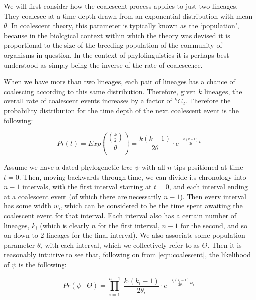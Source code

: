 \documentclass[10pt,journal,compsoc]{IEEEtran}
\begin{document}
We will first consider how the coalescent process applies to just two lineages. They coalesce at a time depth drawn from an exponential distribution with mean $\theta$. In coalescent theory, this parameter is typically known as the `population', because in the biological context within which the theory was devised it is proportional to the size of the breeding population of the community of organisms in question. In the context of phylolinguistics it is perhaps best understood as simply being the inverse of the rate of coalescence.

When we have more than two lineages, each pair of lineages has a chance of coalescing according to this same distribution. Therefore, given $k$ lineages, the overall rate of coalescent events increases by a factor of $^{k}C_2$. Therefore the probability distribution for the time depth of the next coalescent event is the following:

\begin{equation}\label{eqn:coalescent}
Pr(t) = Exp\left(\frac{\binom{k}{2}}{\theta}\right) = \frac{k(k-1)}{2\theta} \cdot e^{-\frac{k(k-1)}{2\theta} t}
\end{equation}

Assume we have a dated phylogenetic tree $\psi$ with all $n$ tips positioned at time $t=0$. Then, moving backwards through time, we can divide its chronology into $n - 1$ intervals, with the first interval starting at $t=0$, and each interval ending at a coalescent event (of which there are necessarily $n-1$). Then every interval has some width $w_i$, which can be considered to be the time spent awaiting the coalescent event for that interval. Each interval also has a certain number of lineages, $k_i$ (which is clearly $n$ for the first interval, $n - 1$ for the second, and so on down to $2$ lineages for the final interval). We also associate some population parameter $\theta_i$ with each interval, which we collectively refer to as $\Theta$. Then it is reasonably intuitive to see that, following on from \eqref{eqn:coalescent}, the likelihood of $\psi$ is the following:

\begin{equation}\label{eqn:skyline}
Pr(\psi\;|\;\Theta) = \prod_{i = 1}^{n - 1}\; \frac{k_i(k_i-1)}{2\theta_i} \cdot e^{-\frac{k_i(k_i-1)}{2\theta_i} w_i}
\end{equation}
\end{document}
